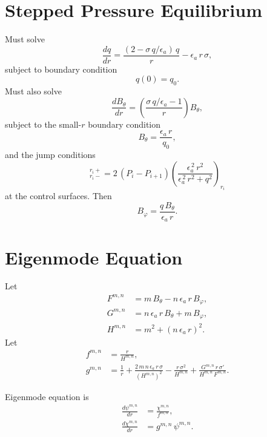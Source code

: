 \documentclass[12pt, oneside]{article}
\begin{document}
\section{Stepped Pressure Equilibrium}
Must solve
\begin{equation}
\frac{dq}{dr} =\frac{(2-\sigma\,q/\epsilon_a)\,q}{r} - \epsilon_a\,r\,\sigma,
\end{equation}
subject to boundary condition
\begin{equation}
q(0) = q_0.
\end{equation}
Must also solve
\begin{equation}
\frac{dB_\theta}{dr} = \left(\frac{\sigma\,q/\epsilon_a-1}{r}\right)B_\theta,
\end{equation}
subject to the small-$r$ boundary condition
\begin{equation}
B_\theta = \frac{\epsilon_a\,r}{q_0},
\end{equation}
and the jump conditions 
\begin{equation}
[B_\theta^{\,2}]_{r_i-}^{r_i+} = 2\,(P_i-P_{i+1})\left(\frac{\epsilon_a^{\,2}\,r^2}{\epsilon_a^{\,2}\,r^2+q^2}\right)_{r_i}
\end{equation}
at the control surfaces. Then
\begin{equation}
B_\varphi = \frac{q\,B_\theta}{\epsilon_a\,r}.
\end{equation}

\section{Eigenmode Equation}
Let
\begin{align}
F^{m,n} &= m\,B_\theta-n\,\epsilon_a\,r\,B_\varphi,\\[0.5ex]
G^{m,n}&=n\,\epsilon_a\,r\,B_\theta + m\,B_\varphi,\\[0.5ex]
H^{m,n}&= m^2+ (n\,\epsilon_a\,r)^2.
\end{align}
Let 
\begin{align}
f^{m,n} &= \frac{r}{H^{m,n}},\\[0.5ex]
g^{m,n} &= \frac{1}{r}+\frac{2\,m\,n\,\epsilon_a\,r\,\sigma }{(H^{m,n})^2}- \frac{r\,\sigma^2}{H^{m,n}}+\frac{G^{m,n}\,r\,\sigma'}{H^{m,n}\,F^{m,n}}.
\end{align}

Eigenmode equation is
\begin{align}
\frac{d\psi^{m,n}}{dr} &= \frac{\chi^{m,n}}{f^{m,n}},\\[0.5ex]
\frac{d\chi^{m,n}}{dr} &= g^{m,n}\,\psi^{m,n}.
\end{align}
\end{document}
